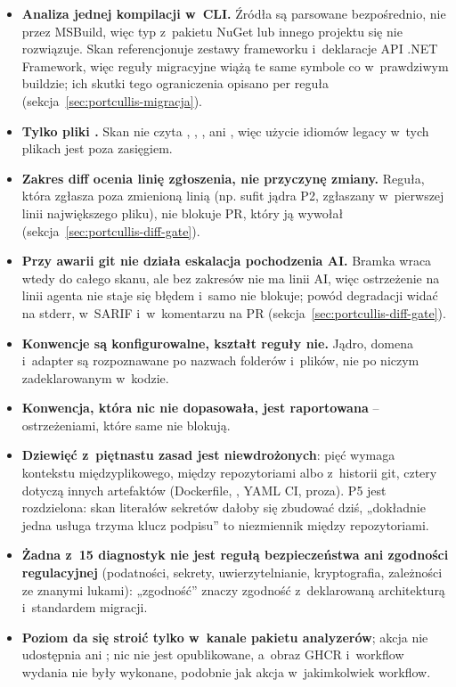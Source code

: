 \begin{itemize}[leftmargin=*]
  \item \textbf{Analiza jednej kompilacji w~CLI.} Źródła są parsowane bezpośrednio, nie
        przez MSBuild, więc typ z~pakietu NuGet lub innego projektu się nie rozwiązuje. Skan
        referencjonuje zestawy frameworku i~deklaracje API .NET Framework, więc reguły
        migracyjne wiążą te same symbole co w~prawdziwym buildzie; ich skutki tego
        ograniczenia opisano per reguła (sekcja~\ref{sec:portcullis-migracja}).
  \item \textbf{Tylko pliki .} Skan nie czyta ,
        , ,  ani ,
        więc użycie idiomów legacy w~tych plikach jest poza zasięgiem.
  \item \textbf{Zakres diff ocenia linię zgłoszenia, nie przyczynę zmiany.} Reguła, która
        zgłasza poza zmienioną linią (np. sufit jądra P2, zgłaszany w~pierwszej linii
        największego pliku), nie blokuje PR, który ją wywołał
        (sekcja~\ref{sec:portcullis-diff-gate}).
  \item \textbf{Przy awarii git nie działa eskalacja pochodzenia AI.} Bramka wraca wtedy do
        całego skanu, ale bez zakresów nie ma linii AI, więc ostrzeżenie na linii agenta nie
        staje się błędem i~samo nie blokuje; powód degradacji widać na stderr, w~SARIF i~w~komentarzu
        na PR (sekcja~\ref{sec:portcullis-diff-gate}).
  \item \textbf{Konwencje są konfigurowalne, kształt reguły nie.} Jądro, domena i~adapter
        są rozpoznawane po nazwach folderów i~plików, nie po niczym zadeklarowanym w~kodzie.
  \item \textbf{Konwencja, która nic nie dopasowała, jest raportowana} -- ostrzeżeniami,
        które same nie blokują.
  \item \textbf{Dziewięć z~piętnastu zasad jest niewdrożonych}: pięć wymaga kontekstu
        międzyplikowego, między repozytoriami albo z~historii git, cztery dotyczą innych
        artefaktów (Dockerfile, , YAML CI, proza). P5 jest rozdzielona:
        skan literałów sekretów dałoby się zbudować dziś, „dokładnie jedna usługa trzyma
        klucz podpisu” to niezmiennik między repozytoriami.
  \item \textbf{Żadna z~15 diagnostyk nie jest regułą bezpieczeństwa ani zgodności
        regulacyjnej} (podatności, sekrety, uwierzytelnianie, kryptografia, zależności ze
        znanymi lukami): „zgodność” znaczy zgodność z~deklarowaną architekturą i~standardem
        migracji.
  \item \textbf{Poziom da się stroić tylko w~kanale pakietu analyzerów}; akcja nie udostępnia
         ani ; nic nie jest opublikowane, a~obraz GHCR
        i~workflow wydania nie były wykonane, podobnie jak akcja w~jakimkolwiek workflow.
\end{itemize}


